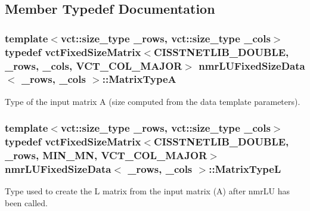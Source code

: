 \subsection{Member Typedef Documentation}
\hypertarget{classnmr_l_u_fixed_size_data_aecd74a0eb81f7dae537d4cce15781210}{}
\subsubsection[{Matrix\+Type\+A}]{\setlength{\rightskip}{0pt plus 5cm}template$<$vct\+::size\+\_\+type \+\_\+rows, vct\+::size\+\_\+type \+\_\+cols$>$ typedef {\bf vct\+Fixed\+Size\+Matrix}$<$C\+I\+S\+S\+T\+N\+E\+T\+L\+I\+B\+\_\+\+D\+O\+U\+B\+L\+E, \+\_\+rows, \+\_\+cols, {\bf V\+C\+T\+\_\+\+C\+O\+L\+\_\+\+M\+A\+J\+O\+R}$>$ {\bf nmr\+L\+U\+Fixed\+Size\+Data}$<$ \+\_\+rows, \+\_\+cols $>$\+::{\bf Matrix\+Type\+A}}\label{classnmr_l_u_fixed_size_data_aecd74a0eb81f7dae537d4cce15781210}
Type of the input matrix A (size computed from the data template parameters). \hypertarget{classnmr_l_u_fixed_size_data_a6bf3bc7a9257ec14a9a47f6144fdbb4c}{}
\subsubsection[{Matrix\+Type\+L}]{\setlength{\rightskip}{0pt plus 5cm}template$<$vct\+::size\+\_\+type \+\_\+rows, vct\+::size\+\_\+type \+\_\+cols$>$ typedef {\bf vct\+Fixed\+Size\+Matrix}$<$C\+I\+S\+S\+T\+N\+E\+T\+L\+I\+B\+\_\+\+D\+O\+U\+B\+L\+E, \+\_\+rows, {\bf M\+I\+N\+\_\+\+M\+N}, {\bf V\+C\+T\+\_\+\+C\+O\+L\+\_\+\+M\+A\+J\+O\+R}$>$ {\bf nmr\+L\+U\+Fixed\+Size\+Data}$<$ \+\_\+rows, \+\_\+cols $>$\+::{\bf Matrix\+Type\+L}}\label{classnmr_l_u_fixed_size_data_a6bf3bc7a9257ec14a9a47f6144fdbb4c}
Type used to create the L matrix from the input matrix (A) after nmr\+L\+U has been called. \hypertarget{classnmr_l_u_fixed_size_data_aba187a86e2a881d8327e56bdbc87b159}{}
